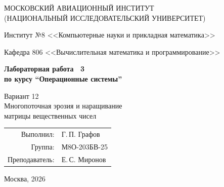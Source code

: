 \begin{titlepage}
\begin{center}
\large
МОСКОВСКИЙ АВИАЦИОННЫЙ ИНСТИТУТ\\
(НАЦИОНАЛЬНЫЙ ИССЛЕДОВАТЕЛЬСКИЙ УНИВЕРСИТЕТ)

\vspace{20pt}
Институт №8 <<Компьютерные науки и прикладная математика>>

Кафедра 806 <<Вычислительная математика и программирование>>
\end{center}

\vspace{60pt}
\begin{center}
\bfseries\large
Лабораторная работа \textnumero\ 3\\
по курсу \enquote{Операционные системы}

\vspace{30pt}
Вариант 12\\
Многопоточная эрозия и наращивание\\
матрицы вещественных чисел
\end{center}

\vfill
\begin{flushright}
\large
\begin{tabular}{rl}
Выполнил: & Г.\,П. Графов \\
Группа: & М8О-203БВ-25 \\
Преподаватель: & Е.\,С. Миронов \\
\end{tabular}
\end{flushright}

\vspace{70pt}
\begin{center}
\large Москва, 2026
\end{center}
\end{titlepage}
\clearpage
